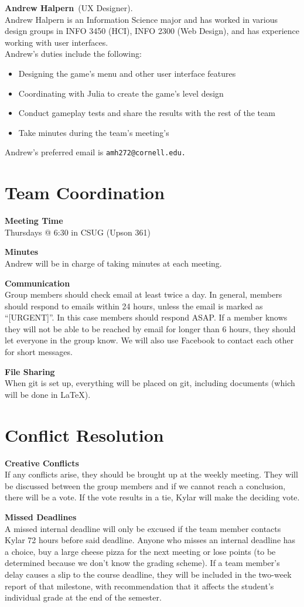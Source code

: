 \documentclass[letterpaper,11pt]{texMemo} %
\newcommand{\teammember}[2]{ \textbf{#1}\ (#2).\ }
\newenvironment{duties}[1]
               {
                 #1's duties include the following:
                 \begin{itemize}
               }
               {
                 \end{itemize}
               }
\newcommand{\preferredemail}[2]{#1's preferred email is \texttt{#2}\\}
\begin{document}
\teammember{Andrew Halpern}{UX Designer}\\Andrew Halpern is an Information Science major and has worked in various design groups in INFO 3450 (HCI), INFO 2300 (Web Design), and has experience working with user interfaces.\\
\begin{duties}{Andrew}
\item{Designing the game’s menu and other user interface features}
\item{Coordinating with Julia to create the game’s level design}
\item{Conduct gameplay tests and share the results with the rest of the team}
\item{Take minutes during the team’s meeting’s}
\end{duties}
\preferredemail{Andrew}{amh272@cornell.edu. }

\section*{Team Coordination}
\textbf{Meeting Time}\\
Thursdays @ 6:30 in CSUG (Upson 361)

\textbf{Minutes}\\
Andrew will be in charge of taking minutes at each meeting.

\textbf{Communication}\\
Group members should check email at least twice a day. In general, members should respond to emails within 24 hours, unless the email is marked as “[URGENT]”. In this case members should respond ASAP. If a member knows they will not be able to be reached by email for longer than 6 hours, they should let everyone in the group know. We will also use Facebook to contact each other for short messages.

\textbf{File Sharing}\\
When git is set up, everything will be placed on git, including documents (which will be done in LaTeX).

\section*{Conflict Resolution}
\textbf{Creative Conflicts}\\
If any conflicts arise, they should be brought up at the weekly meeting. They will be discussed between the group members and if we cannot reach a conclusion, there will be a vote. If the vote results in a tie, Kylar will make the deciding vote. 

\textbf{Missed Deadlines}\\
A missed internal deadline will only be excused if the team member contacts Kylar 72 hours before said deadline. Anyone who misses an internal deadline has a choice, buy a large cheese pizza for the next meeting or lose points (to be determined because we don’t know the grading scheme). If a team member’s delay causes a slip to the course deadline, they will be included in the two-week report of that milestone, with recommendation that it affects the student’s individual grade at the end of the semester.
\end{document}
